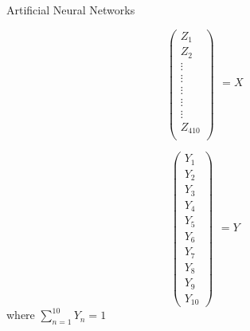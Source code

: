 \documentclass{beamer}
\begin{document}
\begin{frame}{Artificial Neural Networks}
\begin{minipage}[t]{0.5\textwidth}
$$
\begin{pmatrix}
Z_1\\ 
Z_2\\ 
\vdots \\ 
\vdots\\ 
\vdots\\ 
\vdots\\ 
\vdots\\ 
Z_{410}\\ 
\end{pmatrix}
\begin{matrix}
\\ 
\\ 
\\ 
\\ 
=X\\ 
\\ 
\\ 
\\ 
\\
\end{matrix}
$$
\end{minipage}\hfill
\begin{minipage}[t]{0.5\textwidth}
$$
\begin{pmatrix}
Y_1\\ 
Y_2\\ 
Y_3\\ 
Y_4\\ 
Y_5\\ 
Y_6\\ 
Y_7\\ 
Y_8\\ 
Y_{9}\\ 
Y_{10}
\end{pmatrix}
\begin{matrix}
\\ 
\\ 
\\ 
\\ 
\\ 
=Y\\ 
\\ 
\\ 
\\ 
\\ 
\\ 
\end{matrix}
$$
where $\sum_{n=1}^{10}Y_n=1$
\end{minipage}
\end{frame}
\end{document}
